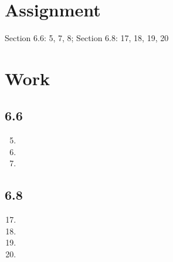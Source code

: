 \documentclass[letterpaper,12pt]{article}
\begin{document}
\section*{Assignment}
Section 6.6: 5, 7, 8; Section 6.8: 17, 18, 19, 20
\section*{Work}
\subsection*{6.6}
\begin{enumerate}
\setcounter{enumi}{4}
\item

\setcounter{enumi}{6}
\item

\item

\end{enumerate}
\newpage{}
\subsection*{6.8}
\begin{enumerate}
\setcounter{enumi}{16}
\item

\item

\item

\item

\end{enumerate}
\end{document}
